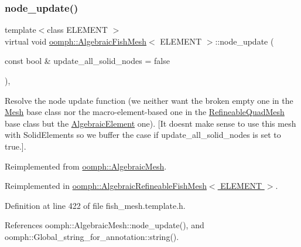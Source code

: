 \mbox{\label{classoomph_1_1AlgebraicFishMesh_a39cd5a86b0f762efd09f4fefba6da1c3}} 
\subsubsection{\texorpdfstring{node\+\_\+update()}{node\_update()}}
{\footnotesize\ttfamily template$<$class E\+L\+E\+M\+E\+NT $>$ \\
virtual void \hyperlink{classoomph_1_1AlgebraicFishMesh}{oomph\+::\+Algebraic\+Fish\+Mesh}$<$ E\+L\+E\+M\+E\+NT $>$\+::node\+\_\+update (\begin{DoxyParamCaption}\item[{const bool \&}]{update\+\_\+all\+\_\+solid\+\_\+nodes = {\ttfamily false} }\end{DoxyParamCaption})\hspace{0.3cm}{\ttfamily [inline]}, {\ttfamily [virtual]}}



Resolve the node update function (we neither want the broken empty one in the \hyperlink{classoomph_1_1Mesh}{Mesh} base class nor the macro-\/element-\/based one in the \hyperlink{classoomph_1_1RefineableQuadMesh}{Refineable\+Quad\+Mesh} base class but the \hyperlink{classoomph_1_1AlgebraicElement}{Algebraic\+Element} one). \mbox{[}It doesn\textquotesingle{}t make sense to use this mesh with Solid\+Elements so we buffer the case if update\+\_\+all\+\_\+solid\+\_\+nodes is set to true.\mbox{]}. 



Reimplemented from \hyperlink{classoomph_1_1AlgebraicMesh_ad3a5638cacb6df1a47c475bb177b6ed7}{oomph\+::\+Algebraic\+Mesh}.



Reimplemented in \hyperlink{classoomph_1_1AlgebraicRefineableFishMesh_a8123da4b48355b39f19e0494a9d4545c}{oomph\+::\+Algebraic\+Refineable\+Fish\+Mesh$<$ E\+L\+E\+M\+E\+N\+T $>$}.



Definition at line 422 of file fish\+\_\+mesh.\+template.\+h.



References oomph\+::\+Algebraic\+Mesh\+::node\+\_\+update(), and oomph\+::\+Global\+\_\+string\+\_\+for\+\_\+annotation\+::string().



